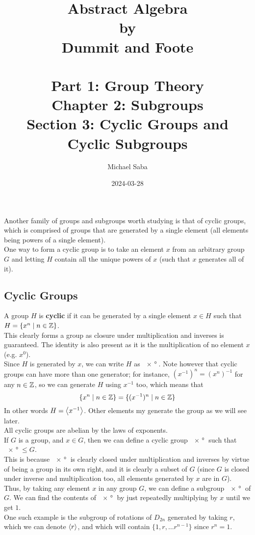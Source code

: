 \documentclass[12pt]{article}
\title{%
    \Huge Abstract Algebra \\
    \large by \\
    \Large Dummit and Foote \\~\\
    \huge Part 1: Group Theory \\
    \LARGE Chapter 2: Subgroups \\
    \Large Section 3: Cyclic Groups and Cyclic Subgroups
}
\date{2024-03-28}
\author{Michael Saba}
\begin{document}
    \maketitle
    \newpage
    \setlength{\parindent}{0pt}

   
    Another family of groups and subgroups worth studying
    is that of cyclic groups,
    which is comprised of groups that are generated
    by a single element
    (all elements being powers of a single element). \\
    One way to form a cyclic group is to take an element $x$
    from an arbitrary group $G$
    and letting $H$ contain all the unique powers of $x$
    (such that $x$ generates all of it). \\


    \subsection*{Cyclic Groups}

    A group $H$ is \textbf{cyclic}
    if it can be generated by a single element 
    $x \in H$ such that $H = \{ x^n \mid n \in \mathbb{Z} \}$. \\
    This clearly forms a group as closure under multiplication
    and inverses is guaranteed.
    The identity is also present as it is the multiplication of
    no element $x$ (e.g. $x^0$). \\
    Since $H$ is generated by $x$,
    we can write $H$ as $\ang{x}$.
    Note however that cyclic groups can have more than one generator;
    for instance, $(x^{-1})^n = (x^n)^{-1}$ for any $n \in \mathbb{Z}$,
    so we can generate $H$ using $x^{-1}$ too,
    which means that
    \[ \{ x^n \mid n \in \mathbb{Z} \} = \{ (x^{-1})^n \mid n \in \mathbb{Z} \} \]
    In other words $H = \left\langle x^{-1} \right\rangle$.
    Other elements my generate the group as we will see later. \\

    All cyclic groups are abelian by the laws of exponents. \\

    If $G$ is a group, and $x \in G$,
    then we can define a cyclic group $\ang{x}$
    such that $\ang{x} \leqslant G$. \\
    This is because $\ang{x}$ is clearly closed under
    multiplication and inverses
    by virtue of being a group in its own right,
    and it is clearly a subset of $G$
    (since $G$ is closed under inverse and multiplication too,
    all elements generated by $x$ are in $G$). \\
    Thus, by taking any element $x$ in any group $G$,
    we can define a subgroup $\ang{x}$ of $G$.
    We can find the contents of $\ang{x}$
    by just repeatedly multiplying by $x$ until we get $1$. \\
    One such example is the subgroup of rotations of $D_{2n}$
    generated by taking $r$,
    which we can denote $\left\langle r \right\rangle$,
    and which will contain
    $\{1, r, \dots r^{n-1}\}$ since $r^n = 1$. \\
\end{document}
